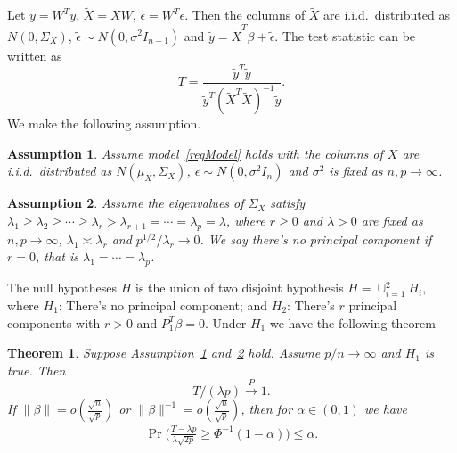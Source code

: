 \documentclass[review]{elsarticle}
\theoremstyle{plain}
\newtheorem{theorem}{\quad\quad Theorem}
\newtheorem{assumption}{\quad\quad Assumption}
\theoremstyle{definition}
\theoremstyle{remark}
\begin{document}
Let $\tilde{y}=W^T y$, $\tilde{X}=XW$, $\tilde{\epsilon}=W^T \epsilon$. Then the columns of $\tilde{X}$ are i.i.d.\  distributed as $N(0,\Sigma_X)$, $\tilde{\epsilon}\sim N(0,\sigma^2 I_{n-1})$ and $\tilde{y}=\tilde{X}^T \beta + \tilde{\epsilon}$.
The test statistic can be written as
\[
    T=\frac{\tilde{y}^T \tilde{y}}{
        \tilde{y}^T{(\tilde{X}^T \tilde{X})}^{-1}\tilde{y}
    }.
    \]
We make the following assumption.
\begin{assumption}\label{assumptiona}
    Assume model~\eqref{regModel} holds with the columns of $X$ are i.i.d.\  distributed as $N(\mu_X,\Sigma_X)$, $\epsilon\sim N(0,\sigma^2 I_n)$ and $\sigma^2$ is fixed as $n,p\to \infty$.
\end{assumption}
\begin{assumption}\label{assumptionb}
    Assume the eigenvalues of $\Sigma_X$ satisfy $\lambda_1\geq \lambda_2\geq \cdots \geq\lambda_r> \lambda_{r+1}=\cdots =\lambda_p=\lambda$, where $r\geq 0$ and $\lambda>0$ are fixed as $n,p\to \infty$, $\lambda_1\asymp \lambda_r$ and $p^{1/2}/\lambda_r \to 0$. We say there's no principal component if $r=0$, that is $\lambda_1=\cdots=\lambda_p$.
\end{assumption}

The null hypotheses $H$ is the union of two disjoint hypothesis $H=\cup_{i=1}^2 H_i$, where $H_1$: There's no principal component; and $H_2$:  There's $r$ principal components with $r>0$ and $P_1^T\beta=0$. Under $H_1$ we have the following theorem

\begin{theorem}\label{theorema}
    Suppose Assumption~\ref{assumptiona} and~\ref{assumptionb} hold.
    Assume $p/n \to  \infty$ and $H_1$ is true. Then
            \begin{equation}
                T/(\lambda p) \xrightarrow{P} 1.
            \end{equation}
    If $\|\beta\|=o(\frac{\sqrt{n}}{\sqrt{p}})$ or $\|\beta\|^{-1}=o(\frac{\sqrt{n}}{\sqrt{p}})$, then for $\alpha\in (0,1)$ we have
\begin{equation}
    \begin{aligned}
    \Pr\Big(\frac{T-\lambda p}{\lambda\sqrt{2p}}\geq \Phi^{-1}(1-\alpha)\Big)\leq \alpha.
    \end{aligned}
\end{equation}
\end{theorem}
\end{document}
